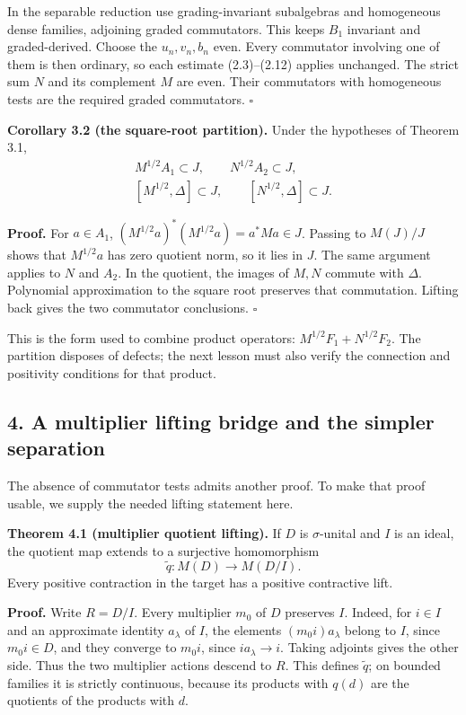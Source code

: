 \documentclass[
  11pt,
]{article}
\begin{document}
In the separable reduction use grading-invariant subalgebras and
homogeneous dense families, adjoining graded commutators. This keeps
\(B_1\) invariant and graded-derived. Choose the \(u_n,v_n,b_n\) even.
Every commutator involving one of them is then ordinary, so each
estimate (2.3)--(2.12) applies unchanged. The strict sum \(N\) and its
complement \(M\) are even. Their commutators with homogeneous tests are
the required graded commutators. \(\square\)

\textbf{Corollary 3.2 (the square-root partition).} Under the hypotheses
of Theorem 3.1, \[
\begin{gathered}
M^{1/2}A_1\subset J,\qquad N^{1/2}A_2\subset J,\\
[M^{1/2},\Delta]\subset J,\qquad
[N^{1/2},\Delta]\subset J.
\end{gathered}
\tag{3.1}
\]

\textbf{Proof.} For \(a\in A_1\), \((M^{1/2}a)^*(M^{1/2}a)=a^*Ma\in J\).
Passing to \(M(J)/J\) shows that \(M^{1/2}a\) has zero quotient norm, so
it lies in \(J\). The same argument applies to \(N\) and \(A_2\). In the
quotient, the images of \(M,N\) commute with \(\Delta\). Polynomial
approximation to the square root preserves that commutation. Lifting
back gives the two commutator conclusions. \(\square\)

This is the form used to combine product operators:
\(M^{1/2}F_1+N^{1/2}F_2\). The partition disposes of defects; the next
lesson must also verify the connection and positivity conditions for
that product.

\subsection{4. A multiplier lifting bridge and the simpler
separation}\label{a-multiplier-lifting-bridge-and-the-simpler-separation}

The absence of commutator tests admits another proof. To make that proof
usable, we supply the needed lifting statement here.

\textbf{Theorem 4.1 (multiplier quotient lifting).} If \(D\) is
\(\sigma\)-unital and \(I\) is an ideal, the quotient map extends to a
surjective homomorphism \[
\widetilde q:M(D)\longrightarrow M(D/I).
\tag{4.1}
\] Every positive contraction in the target has a positive contractive
lift.

\textbf{Proof.} Write \(R=D/I\). Every multiplier \(m_0\) of \(D\)
preserves \(I\). Indeed, for \(i\in I\) and an approximate identity
\(a_\lambda\) of \(I\), the elements \((m_0i)a_\lambda\) belong to
\(I\), since \(m_0i\in D\), and they converge to \(m_0i\), since
\(ia_\lambda\to i\). Taking adjoints gives the other side. Thus the two
multiplier actions descend to \(R\). This defines \(\widetilde q\); on
bounded families it is strictly continuous, because its products with
\(q(d)\) are the quotients of the products with \(d\).
\end{document}
